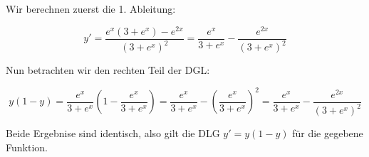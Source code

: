 \item Wir berechnen zuerst die 1. Ableitung:

$$y' = \frac{e^x(3+e^x)-e^{2x}}{\left(3+e^x\right)^2} = \frac{e^x}{3+e^x} - \frac{e^{2x}}{\left(3+e^x\right)^2}$$

Nun betrachten wir den rechten Teil der DGL:

$$y(1-y)
  = \frac{e^x}{3+e^x} (1-\frac{e^x}{3+e^x}) 
  = \frac{e^x}{3+e^x} - \left(\frac{e^x}{3+e^x}\right)^2
  = \frac{e^x}{3+e^x} - \frac{e^{2x}}{(3+e^x)^2}$$

Beide Ergebnise sind identisch, also gilt die DLG $y'=y(1-y)$ für die gegebene Funktion.
